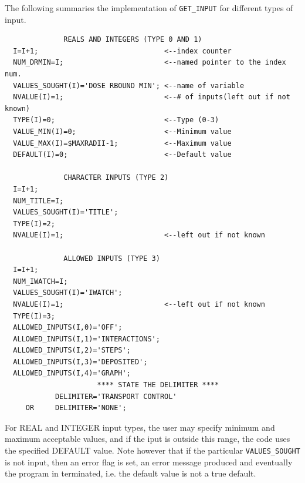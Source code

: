 \documentclass[12pt,twoside]{article}  %
\begin{document}
The following summaries the implementation of \verb+GET_INPUT+ for 
different types of input.
\begin{verbatim}
              REALS AND INTEGERS (TYPE 0 AND 1)
  I=I+1;                              <--index counter                     
  NUM_DRMIN=I;                        <--named pointer to the index num.   
  VALUES_SOUGHT(I)='DOSE RBOUND MIN'; <--name of variable                  
  NVALUE(I)=1;                        <--# of inputs(left out if not known)
  TYPE(I)=0;                          <--Type (0-3)                        
  VALUE_MIN(I)=0;                     <--Minimum value                     
  VALUE_MAX(I)=$MAXRADII-1;           <--Maximum value                     
  DEFAULT(I)=0;                       <--Default value                     
                                                                           
              CHARACTER INPUTS (TYPE 2)
  I=I+1;
  NUM_TITLE=I;
  VALUES_SOUGHT(I)='TITLE';
  TYPE(I)=2;
  NVALUE(I)=1;                        <--left out if not known

              ALLOWED INPUTS (TYPE 3)
  I=I+1;
  NUM_IWATCH=I;
  VALUES_SOUGHT(I)='IWATCH';
  NVALUE(I)=1;                        <--left out if not known
  TYPE(I)=3;
  ALLOWED_INPUTS(I,0)='OFF';
  ALLOWED_INPUTS(I,1)='INTERACTIONS';
  ALLOWED_INPUTS(I,2)='STEPS';
  ALLOWED_INPUTS(I,3)='DEPOSITED';
  ALLOWED_INPUTS(I,4)='GRAPH';
                      **** STATE THE DELIMITER ****                        
            DELIMITER='TRANSPORT CONTROL'                                  
     OR     DELIMITER='NONE';                                              
\end{verbatim}
For REAL and INTEGER input types, the user may specify minimum and
maximum acceptable values, and if the iput is outside this range,
the code uses the specified DEFAULT value. Note however that if the
particular \verb+VALUES_SOUGHT+ is not input, then an error flag is set,
an error message produced and eventually the program in terminated,
i.e. the default value is not a true default.
\end{document}
